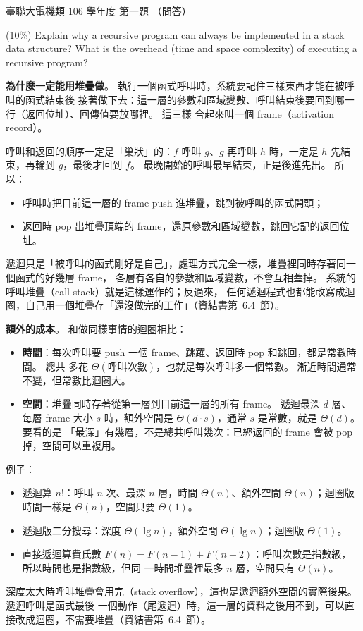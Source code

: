 \begin{pastexam}[label={px:ust-106-ee-ds-01}]{臺聯大電機類 106 學年度 第一題}
（問答）

(10\%) Explain why a recursive program can always be implemented in a stack data structure? What
is the overhead (time and space complexity) of executing a recursive program?
\end{pastexam}

\begin{pastsoln}
\textbf{為什麼一定能用堆疊做}。 執行一個函式呼叫時，系統要記住三樣東西才能在被呼叫的函式結束後
接著做下去：這一層的參數和區域變數、呼叫結束後要回到哪一行（返回位址）、回傳值要放哪裡。 這三樣
合起來叫一個 frame（activation record）。

呼叫和返回的順序一定是「巢狀」的：$f$ 呼叫 $g$、$g$ 再呼叫 $h$ 時，一定是 $h$ 先結束，再輪到
$g$，最後才回到 $f$。 最晚開始的呼叫最早結束，正是後進先出。 所以：
\begin{itemize}
\item 呼叫時把目前這一層的 frame push 進堆疊，跳到被呼叫的函式開頭；
\item 返回時 pop 出堆疊頂端的 frame，還原參數和區域變數，跳回它記的返回位址。
\end{itemize}
遞迴只是「被呼叫的函式剛好是自己」，處理方式完全一樣，堆疊裡同時存著同一個函式的好幾層 frame，
各層有各自的參數和區域變數，不會互相蓋掉。 系統的呼叫堆疊（call stack）就是這樣運作的；反過來，
任何遞迴程式也都能改寫成迴圈，自己用一個堆疊存「還沒做完的工作」（資結書第~6.4~節）。

\textbf{額外的成本}。 和做同樣事情的迴圈相比：
\begin{itemize}
\item \textbf{時間}：每次呼叫要 push 一個 frame、跳躍、返回時 pop 和跳回，都是常數時間。 總共
多花 $\Theta(\text{呼叫次數})$，也就是每次呼叫多一個常數。 漸近時間通常不變，但常數比迴圈大。
\item \textbf{空間}：堆疊同時存著從第一層到目前這一層的所有 frame。 遞迴最深 $d$ 層、每層 frame
大小 $s$ 時，額外空間是 $\Theta(d \cdot s)$，通常 $s$ 是常數，就是 $\Theta(d)$。 要看的是
「最深」有幾層，不是總共呼叫幾次：已經返回的 frame 會被 pop 掉，空間可以重複用。
\end{itemize}

例子：
\begin{itemize}
\item 遞迴算 $n!$：呼叫 $n$ 次、最深 $n$ 層，時間 $\Theta(n)$、額外空間 $\Theta(n)$；迴圈版
時間一樣是 $\Theta(n)$，空間只要 $\Theta(1)$。
\item 遞迴版二分搜尋：深度 $\Theta(\lg n)$，額外空間 $\Theta(\lg n)$；迴圈版 $\Theta(1)$。
\item 直接遞迴算費氏數 $F(n) = F(n - 1) + F(n - 2)$：呼叫次數是指數級，所以時間也是指數級，但同
一時間堆疊裡最多 $n$ 層，空間只有 $\Theta(n)$。
\end{itemize}
深度太大時呼叫堆疊會用完（stack overflow），這也是遞迴額外空間的實際後果。 遞迴呼叫是函式最後
一個動作（尾遞迴）時，這一層的資料之後用不到，可以直接改成迴圈，不需要堆疊（資結書第~6.4~節）。
\end{pastsoln}
